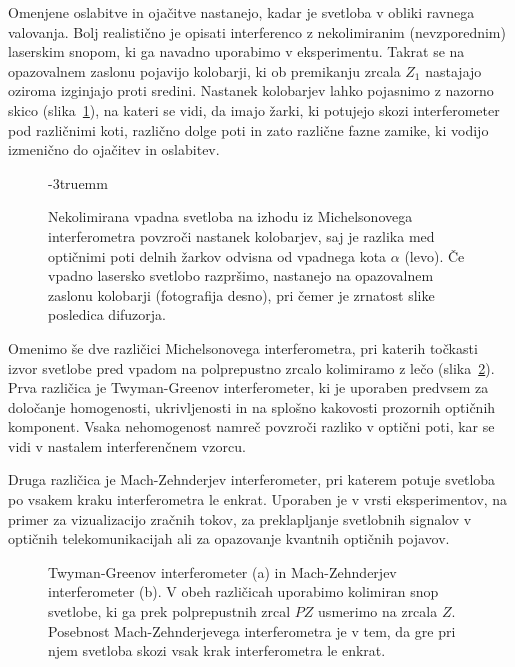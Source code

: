 Omenjene oslabitve in ojačitve nastanejo, kadar je svetloba v obliki ravnega valovanja.
Bolj realistično je opisati interferenco z nekolimiranim (nevzporednim) laserskim snopom, ki ga
navadno uporabimo v eksperimentu. Takrat se na opazovalnem zaslonu pojavijo 
kolobarji, ki ob premikanju zrcala $Z_1$ nastajajo oziroma izginjajo proti 
sredini. Nastanek kolobarjev lahko pojasnimo z nazorno skico 
(slika~\ref{fig:06_kolobarji}), na kateri se vidi, da imajo žarki, 
ki potujejo skozi interferometer pod različnimi 
koti, različno dolge poti in zato različne fazne zamike, ki vodijo izmenično
do ojačitev in oslabitev.
\begin{figure}[ht]
\centering
\def\svgwidth{100truemm} 

\caption{Nekolimirana vpadna svetloba na izhodu iz Michelsonovega interferometra
povzroči nastanek kolobarjev, saj je razlika med optičnimi poti delnih žarkov
odvisna od vpadnega kota $\alpha$ (levo). Če vpadno lasersko svetlobo razpršimo,
nastanejo na opazovalnem zaslonu kolobarji (fotografija desno), 
pri čemer je zrnatost slike posledica difuzorja.
}
\vglue-3truemm
\label{fig:06_kolobarji}
\end{figure}

Omenimo še dve različici Michelsonovega interferometra, pri katerih
točkasti izvor svetlobe pred vpadom na polprepustno zrcalo kolimiramo z lečo 
(slika~\ref{fig:06_TG-MZ}). Prva različica je Twyman-Greenov interferometer, 
ki je uporaben predvsem za
določanje homogenosti, ukrivljenosti in na splošno kakovosti prozornih 
optičnih komponent. Vsaka nehomogenost namreč povzroči razliko v optični poti,
kar se vidi v nastalem interferenčnem vzorcu. 

Druga različica je Mach-Zehnderjev interferometer, pri
katerem potuje svetloba po vsakem kraku interferometra le enkrat. Uporaben je v vrsti
eksperimentov, na primer za vizualizacijo zračnih tokov, za preklapljanje 
svetlobnih signalov v optičnih telekomunikacijah ali za opazovanje kvantnih
optičnih pojavov.
\begin{figure}[ht]
\centering
\def\svgwidth{140truemm} 

\caption{Twyman-Greenov interferometer (a) in Mach-Zehnderjev 
interferometer (b). V obeh različicah uporabimo kolimiran
snop svetlobe, ki ga prek polprepustnih zrcal $PZ$ usmerimo na zrcala $Z$. Posebnost
Mach-Zehnderjevega interferometra je v tem, da gre pri njem svetloba skozi vsak krak
interferometra le enkrat. 
}
\label{fig:06_TG-MZ}
\end{figure}

